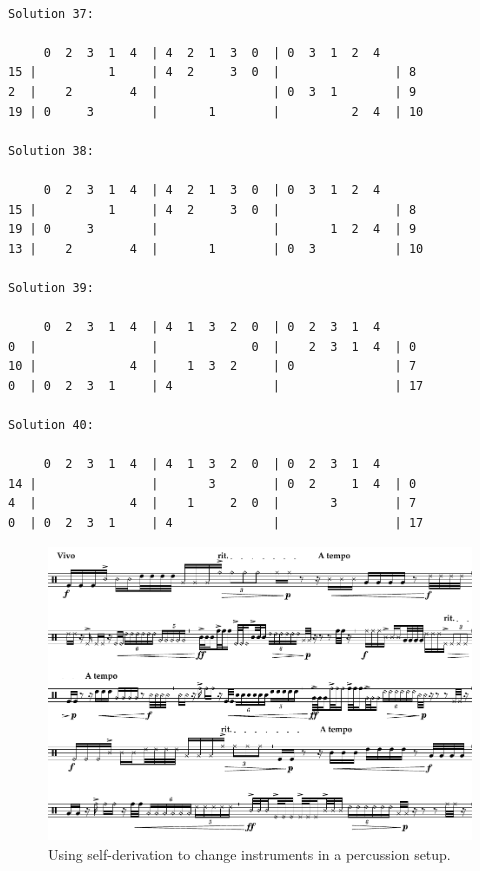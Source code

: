 \begin{lstlisting}[basicstyle=\ttfamily\footnotesize,numbers=none,caption={Output of Listing~\ref{writeSolutions} for problem size three and row $\{0, 2, 3, 1, 4\}$.},label={list:percussion}]

Solution 37:

     0  2  3  1  4  | 4  2  1  3  0  | 0  3  1  2  4  
15 |          1     | 4  2     3  0  |                | 8
2  |    2        4  |                | 0  3  1        | 9
19 | 0     3        |       1        |          2  4  | 10

Solution 38:

     0  2  3  1  4  | 4  2  1  3  0  | 0  3  1  2  4  
15 |          1     | 4  2     3  0  |                | 8
19 | 0     3        |                |       1  2  4  | 9
13 |    2        4  |       1        | 0  3           | 10

Solution 39:

     0  2  3  1  4  | 4  1  3  2  0  | 0  2  3  1  4  
0  |                |             0  |    2  3  1  4  | 0
10 |             4  |    1  3  2     | 0              | 7
0  | 0  2  3  1     | 4              |                | 17

Solution 40:

     0  2  3  1  4  | 4  1  3  2  0  | 0  2  3  1  4  
14 |                |       3        | 0  2     1  4  | 0
4  |             4  |    1     2  0  |       3        | 7
0  | 0  2  3  1     | 4              |                | 17
\end{lstlisting}

\begin{figure}[H]
\centering
\includegraphics[width=6.5in]{figures/Example_Percussion.pdf}
\caption[Using self-derivation in a percussion setup.]{Using self-derivation to change instruments in a percussion setup.}
\label{fig:percussion}
\end{figure}

